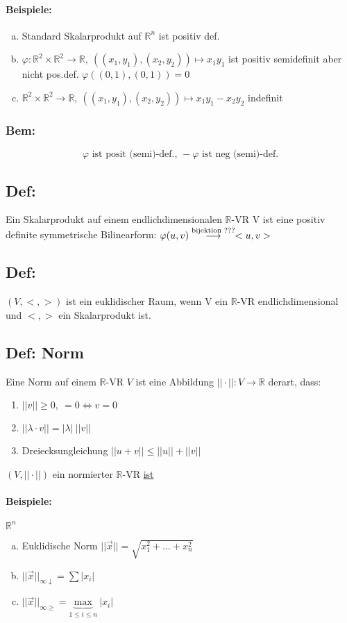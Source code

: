 \documentclass[titlepage,12pt,a4paper,ngerman]{report}
\newcommand{\tx}[1]{\textrm{#1}}
\begin{document}
\paragraph{Beispiele:} 
\begin{enumerate}[(a)]
	\item Standard Skalarprodukt auf $\mathbb R^n$ ist positiv def.
	\item $\varphi: \mathbb R^2 \times \mathbb R^2 \to \mathbb R,\ ((x_1,y_1),(x_2,y_2)) \mapsto x_1 y_1$ ist positiv semidefinit aber nicht pos.def. $\varphi ((0,1),(0,1)) = 0$
	\item $\mathbb R^2 \times \mathbb R^2 \to \mathbb R,\ ((x_1,y_1),(x_2,y_2)) \mapsto x_1y_1  - x_2y_2$ indefinit
\end{enumerate}
\subsubsection*{Bem:}  
$$\varphi \tx{ ist posit (semi)-def., } -\varphi \tx{ ist neg (semi)-def.}$$
\subsection{Def:}
Ein Skalarprodukt auf einem endlichdimensionalen $ \mathbb{R} $-VR V ist eine positiv definite symmetrische Bilinearform: $ \varphi(u,v) \buildrel \tx{bijektion ???} \over \longrightarrow <u,v> $
\subsection{Def:}
$ (V,<,>) $ ist ein euklidischer Raum, wenn V ein $ \mathbb{R} $-VR endlichdimensional  und $ <,> $ ein Skalarprodukt ist.
\subsection{Def: Norm}
Eine Norm auf einem $\mathbb R$-VR $V$ ist eine Abbildung $||\cdot||: V \to \mathbb R$ derart, dass:
\begin{enumerate}
	\item $||v|| \geq 0,\ = 0 \Leftrightarrow v = 0$
	\item $||\lambda \cdot v|| = |\lambda|\ ||v||$
	\item Dreiecksungleichung $||u + v|| \leq ||u|| + ||v||$
\end{enumerate}
$(V, || \cdot ||)$ ein normierter $\mathbb R$-VR \underline{ist}
\paragraph{Beispiele:} $\mathbb R^n$
\begin{enumerate}[(a)]
	\item Euklidische Norm $||\vec{x}|| = \sqrt{x_1^2+ \dots + x_n^2}$
	\item $||\vec{x}||_{\infty \downarrow} = \sum |x_i|$
	\item $||\vec{x}||_{\infty \geq} = \underbrace{\tx{max}}_{1 \leq i \leq n}\ |x_i|$
\end{enumerate}
\end{document}
